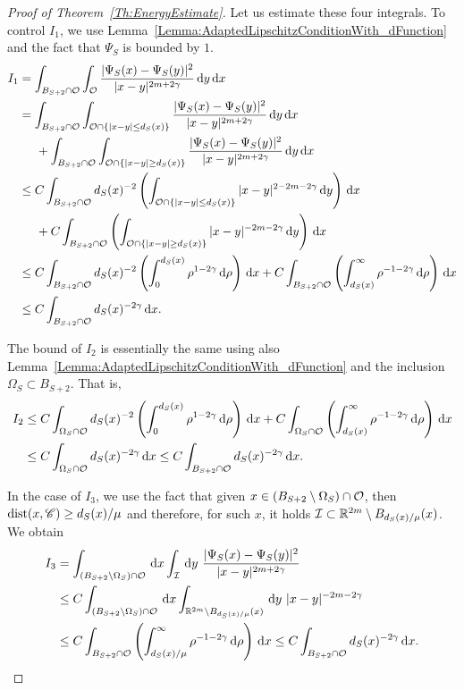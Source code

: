 \begin{proof}[Proof of Theorem~\ref{Th:EnergyEstimate}]
Let us estimate these four integrals. To control $I_1$, we use Lemma~\ref{Lemma:AdaptedLipschitzConditionWith_dFunction} and the fact that $\Psi_S$ is bounded by $1$.
\begin{align*}
I_1 &= \int_{B_{S+2} \cap \mathcal{O}} \int_{\mathcal{O}} \frac{|\Psi_S(x)-\Psi_S(y)|^2}{|x-y|^{2m+2\gamma}} \,\mathrm{d} y\,\mathrm{d} x\\
&= \int_{B_{S+2} \cap \mathcal{O}} \int_{\mathcal{O}\cap\{|x-y|\leq d_S(x)\}} \frac{|\Psi_S(x)-\Psi_S(y)|^2}{|x-y|^{2m+2\gamma}} \,\mathrm{d} y\,\mathrm{d} x\\
&\hspace{5mm} + \int_{B_{S+2} \cap \mathcal{O}} \int_{\mathcal{O}\cap\{|x-y|\geq d_S(x)\}} \frac{|\Psi_S(x)-\Psi_S(y)|^2}{|x-y|^{2m+2\gamma}} \,\mathrm{d} y\,\mathrm{d} x\\
&\leq C \int_{B_{S+2} \cap \mathcal{O}} d_S(x)^{-2}\left(\int_{\mathcal{O}\cap\{|x-y|\leq d_S(x)\}} |x-y|^{2-2m-2\gamma} \,\mathrm{d} y\right)\,\mathrm{d} x\\
&\hspace{5mm} + C \int_{B_{S+2} \cap \mathcal{O}} \left(\int_{\mathcal{O}\cap\{|x-y|\geq d_S(x)\}} |x-y|^{-2m-2\gamma} \,\mathrm{d} y \right)\,\mathrm{d} x\\
&\leq C \int_{B_{S+2} \cap \mathcal{O}} d_S(x)^{-2}\left(\int_0^{d_S(x)} \rho^{1-2\gamma} \,\mathrm{d} \rho\right)\,\mathrm{d} x + C \int_{B_{S+2} \cap \mathcal{O}}  \left(\int_{d_S(x)}^\infty \rho^{-1-2\gamma} \,\mathrm{d}\rho\right) \,\mathrm{d} x\\
&\leq C \int_{B_{S+2} \cap \mathcal{O}} d_S(x)^{-2\gamma} \,\mathrm{d} x.
\end{align*}

The bound of $I_2$ is essentially the same using also Lemma~\ref{Lemma:AdaptedLipschitzConditionWith_dFunction} and the inclusion $\Omega_S \subset B_{S+2}$. That is,
\begin{align*}
I_2 &\leq C \int_{\Omega_S \cap \mathcal{O}} d_S(x)^{-2}\left(\int_0^{d_S(x)} \rho^{1-2\gamma} \,\mathrm{d} \rho\right)\,\mathrm{d} x + C \int_{\Omega_S \cap \mathcal{O}} \left( \int_{d_S(x)}^\infty \rho^{-1-2\gamma} \,\mathrm{d}\rho \right) \,\mathrm{d} x\\
&\leq C \int_{\Omega _S\cap \mathcal{O}} d_S(x)^{-2\gamma} \,\mathrm{d} x \leq C \int_{B_{S+2} \cap \mathcal{O}} d_S(x)^{-2\gamma} \,\mathrm{d} x.
\end{align*}

In the case of $I_3$, we use the fact that given $x\in (B_{S+2}\setminus \Omega_S)\cap \mathcal{O}$, then $\operatorname{dist}(x,\mathscr{C})\geq d_S(x)/\mu$ and therefore, for such $x$, it holds $\mathcal{I} \subset \mathbb{R}^{2m}\setminus B_{d_S(x)/\mu}(x)$. We obtain
\begin{align*}
I_3 &= \int_{(B_{S+2}\setminus \Omega_S) \cap \mathcal{O}} \,\mathrm{d} x \int_{\mathcal{I}} \,\mathrm{d} y \ \frac{|\Psi_S(x)-\Psi_S(y)|^2}{|x-y|^{2m+2\gamma}} \\
&\leq C \int_{(B_{S+2}\setminus \Omega_S) \cap \mathcal{O}} \,\mathrm{d} x \int_{\mathbb{R}^{2m}\setminus B_{d_S(x)/\mu }(x)} \,\mathrm{d} y \ |x-y|^{-2m-2\gamma} \\
&\leq C \int_{B_{S+2} \cap \mathcal{O}} \left(\int_{d_S(x)/\mu}^\infty \rho^{-1-2\gamma} \,\mathrm{d} \rho \right)\,\mathrm{d} x \leq C \int_{B_{S+2} \cap \mathcal{O}} d_S(x)^{-2\gamma} \,\mathrm{d} x.
\end{align*}


\end{proof}
